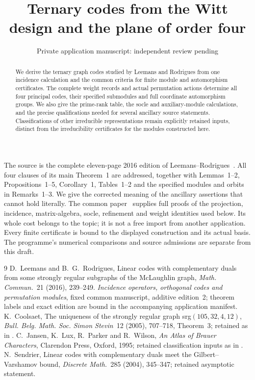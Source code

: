 \documentclass[11pt,a4paper]{article}
\title{Ternary codes from the Witt design and the plane of order four}
\author{Private application manuscript: independent review pending}
\date{}
\begin{document}
\maketitle
\begin{abstract}
We derive the ternary graph codes studied by Leemans and Rodrigues from
one incidence calculation and the common criteria for finite module and
automorphism certificates. The complete weight records and actual
permutation actions determine all four principal codes, their specified
submodules and full coordinate automorphism groups. We also give the
prime-rank table, the socle and auxiliary-module calculations, and the
precise qualifications needed for several ancillary source statements.
Classifications of other irreducible representations remain explicitly
retained inputs, distinct from the irreducibility certificates for the
modules constructed here.
\end{abstract}

The source is the complete eleven-page 2016 edition of
Leemans--Rodrigues~\cite{LR}. All four clauses of its main Theorem~1 are
addressed, together with Lemmas~1--2, Propositions~1--5, Corollary~1,
Tables~1--2 and the specified modules and orbits in Remarks~1--3.
We give the corrected meaning of the ancillary assertions that cannot
hold literally. The common paper~\cite{U} supplies full proofs of the
projection, incidence, matrix-algebra, socle, refinement and weight
identities used below. Its whole cost belongs to the topic; it is not a
free import from another application. Every finite certificate is bound
to the displayed construction and its actual basis. The programme's
numerical comparisons and source admissions are separate from this draft.











\begin{thebibliography}{9}
 D.~Leemans and B.~G.~Rodrigues,
Linear codes with complementary duals from some strongly regular
subgraphs of the McLaughlin graph, \emph{Math. Commun.}~21 (2016), 239--249.
 \emph{Incidence operators, orthogonal codes and permutation modules},
fixed common manuscript, additive edition~2; theorem labels and exact
edition are bound in the accompanying application manifest.
 K.~Coolsaet, The uniqueness of the strongly regular
graph srg$(105,32,4,12)$, \emph{Bull. Belg. Math. Soc. Simon Stevin}~12
(2005), 707--718, Theorem~3; retained as in \cite[reference~6]{LR}.
 C.~Jansen, K.~Lux, R.~Parker and R.~Wilson,
\emph{An Atlas of Brauer Characters}, Clarendon Press, Oxford, 1995;
retained classification inputs as in \cite[reference~13]{LR}.
 N.~Sendrier, Linear codes with complementary duals
meet the Gilbert--Varshamov bound, \emph{Discrete Math.}~285 (2004),
345--347; retained asymptotic statement.
\end{thebibliography}
\end{document}
